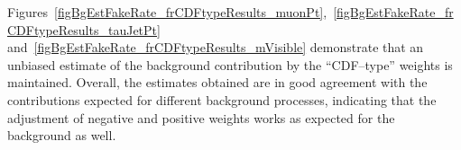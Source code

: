 
Figures~\ref{figBgEstFakeRate_frCDFtypeResults_muonPt},~\ref{figBgEstFakeRate_frCDFtypeResults_tauJetPt} 
and~\ref{figBgEstFakeRate_frCDFtypeResults_mVisible}
demonstrate that an unbiased estimate of the background contribution by the ``CDF--type'' weights is maintained.
Overall, the estimates obtained are in good agreement with the contributions
expected for different background processes, indicating that the adjustment of negative and positive weights 
works as expected for the background as well.

